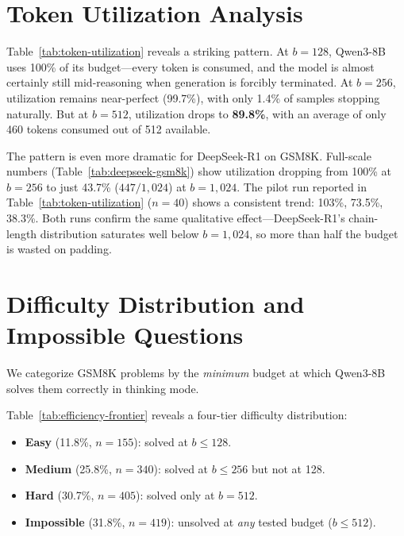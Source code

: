 \section{Token Utilization Analysis}
\label{app:utilization}



Table~\ref{tab:token-utilization} reveals a striking pattern.
At $b{=}128$, Qwen3-8B uses 100\% of its budget---every token is
consumed, and the model is almost certainly still mid-reasoning when
generation is forcibly terminated.
At $b{=}256$, utilization remains near-perfect (99.7\%), with only 1.4\%
of samples stopping naturally.
But at $b{=}512$, utilization drops to \textbf{89.8\%}, with an average
of only 460 tokens consumed out of 512 available.

The pattern is even more dramatic for DeepSeek-R1 on GSM8K.
Full-scale numbers (Table~\ref{tab:deepseek-gsm8k}) show utilization dropping from 100\% at $b{=}256$ to just 43.7\% ($447/1{,}024$) at $b{=}1{,}024$.
The pilot run reported in Table~\ref{tab:token-utilization} ($n{=}40$) shows a consistent trend: 103\%, 73.5\%, 38.3\%.
Both runs confirm the same qualitative effect---DeepSeek-R1's chain-length distribution saturates well below $b{=}1{,}024$, so more than half the budget is wasted on padding.

\section{Difficulty Distribution and Impossible Questions}
\label{app:impossible}

We categorize GSM8K problems by the \emph{minimum} budget at which Qwen3-8B
solves them correctly in thinking mode.



Table~\ref{tab:efficiency-frontier} reveals a four-tier difficulty distribution:
\begin{itemize}[nosep,leftmargin=*]
  \item \textbf{Easy} (11.8\%, $n{=}155$): solved at $b{\leq}128$.
  \item \textbf{Medium} (25.8\%, $n{=}340$): solved at $b{\leq}256$ but not at 128.
  \item \textbf{Hard} (30.7\%, $n{=}405$): solved only at $b{=}512$.
  \item \textbf{Impossible} (31.8\%, $n{=}419$): unsolved at \emph{any}
    tested budget ($b{\leq}512$).
\end{itemize}

